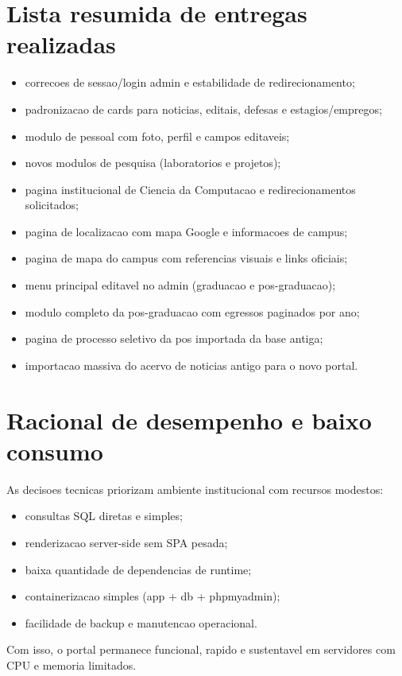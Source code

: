 \documentclass[12pt,a4paper]{article}
\begin{document}
\section{Lista resumida de entregas realizadas}
\begin{itemize}
    \item correcoes de sessao/login admin e estabilidade de redirecionamento;
    \item padronizacao de cards para noticias, editais, defesas e estagios/empregos;
    \item modulo de pessoal com foto, perfil e campos editaveis;
    \item novos modulos de pesquisa (laboratorios e projetos);
    \item pagina institucional de Ciencia da Computacao e redirecionamentos solicitados;
    \item pagina de localizacao com mapa Google e informacoes de campus;
    \item pagina de mapa do campus com referencias visuais e links oficiais;
    \item menu principal editavel no admin (graduacao e pos-graduacao);
    \item modulo completo da pos-graduacao com egressos paginados por ano;
    \item pagina de processo seletivo da pos importada da base antiga;
    \item importacao massiva do acervo de noticias antigo para o novo portal.
\end{itemize}

\section{Racional de desempenho e baixo consumo}
As decisoes tecnicas priorizam ambiente institucional com recursos modestos:
\begin{itemize}
    \item consultas SQL diretas e simples;
    \item renderizacao server-side sem SPA pesada;
    \item baixa quantidade de dependencias de runtime;
    \item containerizacao simples (app + db + phpmyadmin);
    \item facilidade de backup e manutencao operacional.
\end{itemize}
Com isso, o portal permanece funcional, rapido e sustentavel em servidores com CPU e memoria limitados.
\end{document}
